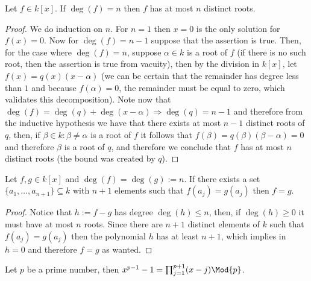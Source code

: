 \begin{lemma}
    Let \(f \in k[x]\). If \(\deg(f) = n\) then \(f\) has at most \(n\) distinct
    roots.
\end{lemma}

\begin{proof}
    We do induction on \(n\). For \(n = 1\) then \(x = 0\) is the only solution
    for \(f(x) = 0\). Now for \(\deg(f) = n-1\) suppose that the assertion is
    true. Then, for the case where \(\deg(f) = n\), suppose \(\alpha \in k\) is a
    root of \(f\) (if there is no such root, then the assertion is true from
    vacuity), then by the division in \(k[x]\), let  \(f(x) = q(x)(x-\alpha)\)
    (we can be certain that the remainder has degree less than \(1\) and because
    \(f(\alpha) = 0\), the remainder must be equal to zero, which validates this
    decomposition). Note now that \(\deg(f) = \deg(q) + \deg(x-\alpha)
    \Rightarrow \deg(q) = n-1\) and therefore from the inductive hypothesis we
    have that there exists at most \(n-1\) distinct roots of \(q\), then, if
    \(\beta \in k : \beta \neq \alpha\) is a root of \(f\) it follows that
    \(f(\beta) = q(\beta)(\beta - \alpha) = 0\) and therefore \(\beta\) is a root
    of \(q\), and therefore we conclude that \(f\) has at most \(n\) distinct
    roots (the bound was created by \(q\)).
\end{proof}

\begin{corollary}
    Let \(f, g \in k[x]\) and \(\deg(f) = \deg(g) := n\). If there exists a set
    \(\{a_1, \dots, a_{n+1}\} \subseteq k\) with \(n+1\) elements such that
    \(f(a_j) = g(a_j)\) then \(f = g\).
\end{corollary}

\begin{proof}
    Notice that \(h := f - g\) has degree \(\deg(h) \leqslant n\), then, if
    \(\deg(h) \geqslant 0\) it must have at most \(n\) roots. Since there are
    \(n+1\) distinct elements of \(k\) such that \(f(a_j) = g(a_j)\) then the
    polynomial \(h\) has at least \(n+1\), which implies in \(h = 0\) and
    therefore \(f = g\) as wanted.
\end{proof}

\begin{proposition}
    Let \(p\) be a prime number, then  \(x^{p-1} - 1 = \prod_{j=1}^{p+1} (x - j)
    \Mod{p}\).
\end{proposition}

